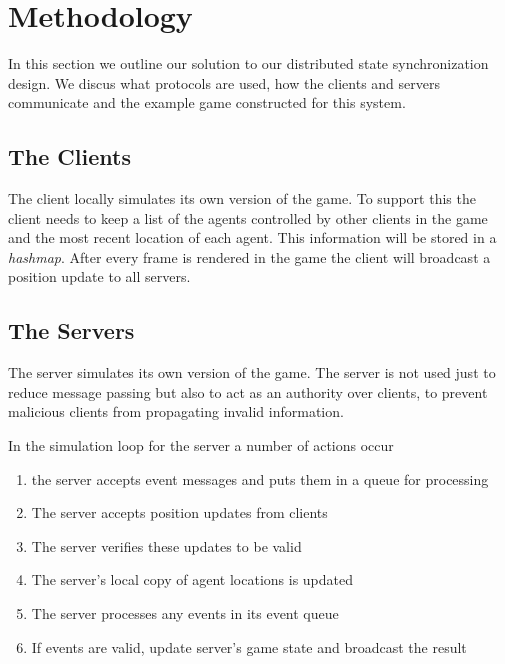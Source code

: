 
\section{Methodology}
\label{sec:methodology}



	In this section we outline our solution to our distributed state synchronization design. We discus what protocols are used, how the clients and servers communicate and the example game constructed for this system.
	
\subsection{The Clients}

	The client locally simulates its own version of the game. To support this the client needs to keep a list of the agents controlled by other clients in the game and the most recent location of each agent. This information will be stored in a \emph{hashmap}. After every frame is rendered in the game the client will broadcast a position update to all servers.
	
\subsection{The Servers}

	The server simulates its own version of the game. The server is not used just to reduce message passing but also to act as an authority over clients, to prevent malicious clients from propagating invalid information.
	
	In the simulation loop for the server a number of actions occur
	\begin{enumerate}[topsep=2pt,itemsep=-1ex,partopsep=1ex,parsep=1ex]
		\item the server accepts event messages and puts them in a queue for processing
		\item The server accepts position updates from clients
		\item The server verifies these updates to be valid
		\item The server's local copy of agent locations is updated
		\item The server processes any events in its event queue
		\item If events are valid, update server's game state and broadcast the result
	\end{enumerate}
	
